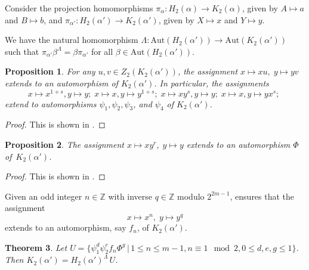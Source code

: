 \documentclass{amsart}
\newtheorem{theorem}{Theorem}[section]
\newtheorem{prop}[theorem]{Proposition}
\theoremstyle{definition}
\theoremstyle{remark}
\newcommand \Z{{\mathbb Z}}
\begin{document}
Consider the projection homomorphisms $\pi_\alpha:H_2(\alpha)\to K_2(\alpha)$, given by $A\mapsto a$ and $B\mapsto b$,
and $\pi_{\alpha'}:H_2(\alpha')\to K_2(\alpha')$, given by $X\mapsto x$ and $Y\mapsto y$.

We have the natural homomorphism $\Lambda:\mathrm{Aut}(H_2(\alpha'))\to \mathrm{Aut}(K_2(\alpha'))$ such that
$\pi_{\alpha'} \beta^\Lambda= \beta\pi_{\alpha'}$
for all $\beta\in \mathrm{Aut}(H_2(\alpha'))$.

\begin{prop}\label{autexcel}
    For any $u,v\in Z_2(K_2(\alpha'))$, the assignment $x\mapsto xu,\; y\mapsto yv$ extends to an automorphism
		 of $K_2(\alpha')$. In particular, the assignments
		$$
		x\mapsto x^{1+s},y\mapsto y;\;
    x\mapsto x, y\mapsto y^{1+s};\; x\mapsto xy^{s},y\mapsto y;\; x\mapsto x,y\mapsto yx^s;\;
    $$
		extend to automorphisms $\psi_1,\psi_2,\psi_3$, and $\psi_4$ of $K_2(\alpha')$.
\end{prop}

\begin{proof} This is shown in \cite[Proposition 5.9]{MS3}.
\end{proof}

\begin{prop}\label{newauto}
    The assignment $x\mapsto xy^r,\; y\mapsto y$ extends to an automorphism $\Phi$ of~$K_2(\alpha')$.
\end{prop}

\begin{proof} This is shown in \cite[Proposition 5.12]{MS3}.
\end{proof}


Given an odd integer $n\in\Z$ with inverse $q\in\Z$ modulo $2^{2m-1}$, \cite[Proposition 5.10]{MS3} ensures
that the assignment
\begin{equation*}
x\mapsto x^n,\; y\mapsto y^q
\end{equation*}
extends to an automorphism, say $f_n$, of $K_2(\alpha')$.


\begin{theorem}\label{indexh} Let $U=\{\psi_1^d\psi_2^e f_n\Phi^g\,|\, 1\leq n\leq m-1, n\equiv 1\mod 2, 0\leq d,e,g\leq 1\}$.
Then $K_2(\alpha')=H_2(\alpha')^\Lambda\, U$.
\end{theorem}
\end{document}
